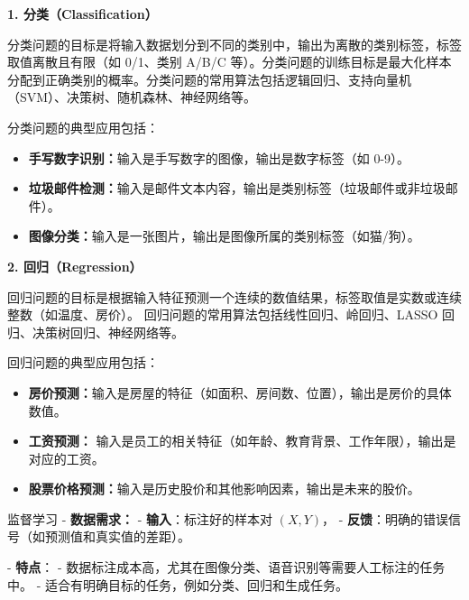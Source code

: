 {\bf  1. 分类（Classification）}

分类问题的目标是将输入数据划分到不同的类别中，输出为离散的类别标签，标签取值离散且有限（如 0/1、类别 A/B/C 等）。分类问题的训练目标是最大化样本分配到正确类别的概率。分类问题的常用算法包括逻辑回归、支持向量机（SVM）、决策树、随机森林、神经网络等。

分类问题的典型应用包括：
\begin{itemize}
\item {\bf 手写数字识别：}输入是手写数字的图像，输出是数字标签（如 0-9）。
 \item {\bf  垃圾邮件检测：}输入是邮件文本内容，输出是类别标签（垃圾邮件或非垃圾邮件）。
\item {\bf  图像分类：}输入是一张图片，输出是图像所属的类别标签（如猫/狗）。
\end{itemize}



 {\bf  2. 回归（Regression）}
 
 回归问题的目标是根据输入特征预测一个连续的数值结果，标签取值是实数或连续整数（如温度、房价）。
回归问题的常用算法包括线性回归、岭回归、LASSO 回归、决策树回归、神经网络等。

回归问题的典型应用包括：
\begin{itemize}
 \item {\bf 房价预测：}输入是房屋的特征（如面积、房间数、位置），输出是房价的具体数值。
\item {\bf  工资预测：} 输入是员工的相关特征（如年龄、教育背景、工作年限），输出是对应的工资。
 \item {\bf 股票价格预测：}输入是历史股价和其他影响因素，输出是未来的股价。
\end{itemize}

%

监督学习
- {\bf 数据需求：}
  - {\bf 输入}：标注好的样本对 $(X, Y)$，
  - {\bf 反馈}：明确的错误信号（如预测值和真实值的差距）。
  
- {\bf 特点}：
  - 数据标注成本高，尤其在图像分类、语音识别等需要人工标注的任务中。
  - 适合有明确目标的任务，例如分类、回归和生成任务。


